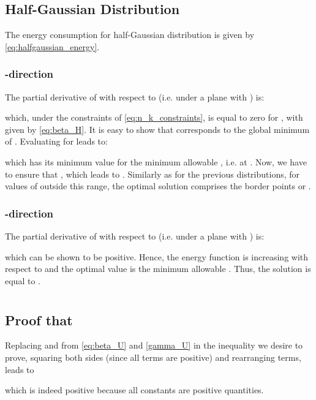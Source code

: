\documentclass[twocolumn,english]{IEEEtran}
\theoremstyle{plain}
\theoremstyle{definition}
\begin{document}
\subsection{Half-Gaussian Distribution\label{sub:Appendix-Half-Gaussian}}

The energy consumption for half-Gaussian distribution is 
given by \eqref{eq:halfgaussian_energy}.


\subsubsection{-direction}

The partial derivative of  with respect to  (i.e.
under a plane  with ) is: 

which, under the constraints of \ref{eq:n_k_constraints}, is equal
to zero for , with
 given by \eqref{eq:beta_H}. It is easy to show
that  corresponds to the global minimum of .
Evaluating  for  leads to:


which has its minimum value for the minimum allowable ,
i.e. at .
Now, we have to ensure that ,
which leads to .
Similarly as for the previous distributions, for values of 
outside this range, the optimal solution comprises the border points
 or .


\subsubsection{-direction}

The partial derivative of  with respect to  (i.e.
under a plane  with )
is: 

which can be shown to be positive. Hence, the energy function is increasing
with respect to  and the optimal value is the minimum allowable
. Thus, the solution is equal to .


\section{\label{sec:Appendix-II}}


\subsection{Proof that }

\label{subsec:ff} Replacing  and 
from \eqref{eq:beta_U} and \eqref{gamma_U} in the inequality we
desire to prove, squaring both sides (since all terms are positive)
and rearranging terms, leads to 

which is indeed positive because all constants are positive quantities.
\end{document}
